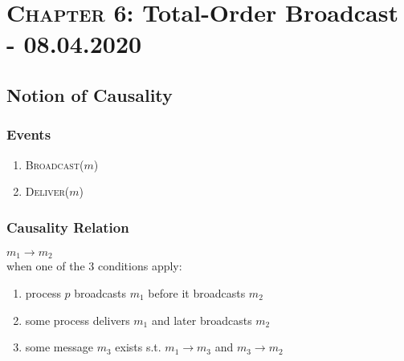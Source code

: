 \documentclass{article}
\begin{document}
	\section{\textsc{Chapter} 6: Total-Order Broadcast - 08.04.2020}
	\begin{adjustwidth}{2em}{2em}
		\subsection{Notion of Causality}
		\begin{adjustwidth}{2em}{2em}
			\subsubsection{Events}
			\begin{adjustwidth}{2em}{}
				\begin{enumerate}[-]
					\item \textsc{Broadcast}($m$)
					\item \textsc{Deliver}($m$)
				\end{enumerate}
			\end{adjustwidth}
			\subsubsection{Causality Relation}
			\begin{adjustwidth}{2em}{}
				$m_1 \rightarrow m_2$ \\
				when one of the 3 conditions apply:
				\begin{enumerate}
					\item process $p$ broadcasts $m_1$ before it broadcasts $m_2$
					\item some process delivers $m_1$ and later broadcasts $m_2$
					\item some message $m_3$ exists s.t. $m_1 \rightarrow m_3$ and $m_3 \rightarrow m_2$
				\end{enumerate}
			\end{adjustwidth}
		\end{adjustwidth}

\end{adjustwidth}
\end{document}
